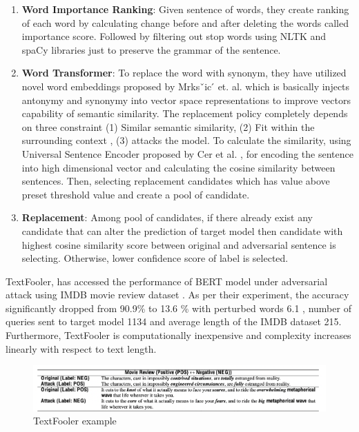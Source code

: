 \documentclass[%
	BCOR=8mm, %
	DIV=12, 
	toc=bibliography, %
	toc=listof, %
	oneside, %
	egregdoesnotlikesansseriftitles, %
	]{scrbook}
\begin{document}
\begin{enumerate}
\item  \textbf{Word Importance Ranking}: Given sentence of words, they create ranking of each word by calculating change before and after deleting the words called importance 
score. Followed by filtering out stop words using NLTK and spaCy libraries just to preserve the grammar of the sentence. 
\item \textbf{Word Transformer}: To replace the word with synonym, they have utilized novel word embeddings proposed by Mrksˇic ́ et$.$ al$.$ \cite{mrksic_counter-fitting_2016} 
which is basically injects antonymy and synonymy into vector space representations to improve vectors capability of semantic similarity. The replacement policy completely depends 
on three constraint (1) Similar semantic similarity, (2) Fit within the surrounding context , (3) attacks the model. To calculate the similarity,  using Universal Sentence Encoder proposed 
by Cer et al. \cite{cer_universal_2018}, for encoding the sentence into high dimensional vector and calculating the cosine similarity between sentences. Then, selecting replacement 
candidates which has value above preset threshold value and create a pool of candidate. 
\item \textbf{Replacement}: Among pool of candidates, if there already exist any candidate that can alter the prediction of target model then candidate with highest cosine similarity 
score between original and adversarial sentence is selecting. Otherwise, lower confidence score of label  is selected.  
\end{enumerate}

TextFooler, has accessed the performance of BERT model under adversarial attack  using IMDB movie review dataset . As per their experiment, the accuracy significantly dropped 
from 90.9\% to 13.6 \% with perturbed words 6.1 , number of queries sent to target model 1134 and average length of the IMDB dataset 215. Furthermore,  TextFooler is computationally 
inexpensive and complexity increases linearly with respect to text length.

\begin{figure}[h!]
\centering
\includegraphics[width=.9\textwidth]{img/textfooler_example.png}
\caption{TextFooler example  \cite{jia_certified_2019} }
\label{diag:TextFoolerExp}
\end{figure}
\end{document}
